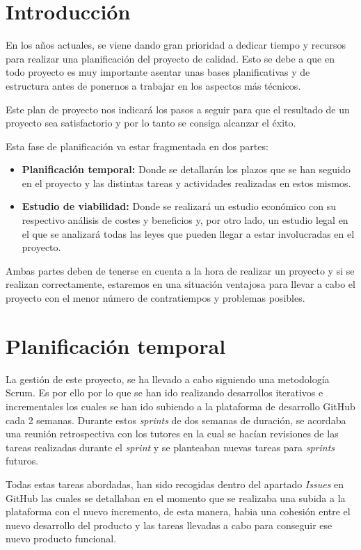 
\section{Introducción}
En los años actuales, se viene dando gran prioridad a dedicar tiempo y recursos para realizar una  planificación del proyecto de calidad. Esto se debe a que en todo proyecto es muy importante asentar unas bases planificativas y de estructura antes de ponernos a trabajar en los aspectos más técnicos.

Este plan de proyecto nos indicará los pasos a seguir para que el resultado de un proyecto sea satisfactorio y por lo tanto se consiga alcanzar el éxito.

Esta fase de planificación va estar fragmentada en dos partes:
\begin{itemize}
\item 
\textbf{Planificación temporal: } Donde se detallarán los plazos que se han seguido en el proyecto y las distintas tareas y actividades realizadas en estos mismos.
\item 
\textbf{Estudio de viabilidad: } Donde se realizará un estudio económico con su respectivo análisis de costes y beneficios y, por otro lado, un estudio legal en el que se analizará todas las leyes que pueden llegar a estar involucradas en el proyecto.
\end{itemize}

Ambas partes deben de tenerse en cuenta a la hora de realizar un proyecto y si se realizan correctamente, estaremos en una situación ventajosa para llevar a cabo el proyecto con el menor número de contratiempos y problemas posibles. 
\section{Planificación temporal}
La gestión de este proyecto, se ha llevado a cabo siguiendo una metodología Scrum. Es por ello por lo que se han ido realizando desarrollos iterativos e incrementales los cuales se han ido subiendo a la plataforma de desarrollo GitHub cada 2 semanas. Durante estos \textit{sprints} de dos semanas de duración, se acordaba una reunión retrospectiva con los tutores en la cual se hacían revisiones de las tareas realizadas durante el \textit{sprint} y se planteaban nuevas tareas para \textit{sprints} futuros.

Todas estas tareas abordadas, han sido recogidas dentro del apartado \textit{Issues} en GitHub las cuales se detallaban en el momento que se realizaba una subida a la plataforma con el nuevo incremento, de esta manera, habia una cohesión entre el nuevo desarrollo del producto y las tareas llevadas a cabo para conseguir ese nuevo producto funcional.

